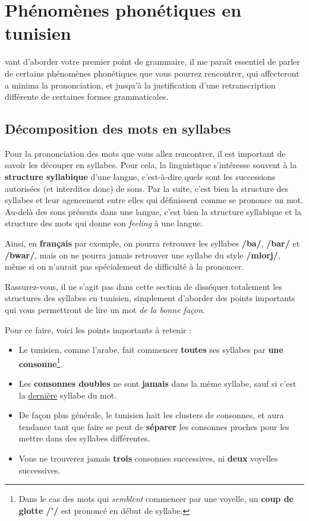\chapter{Phénomènes phonétiques en tunisien}
vant d'aborder votre premier point de grammaire, il me paraît essentiel de parler de certains phénomènes phonétiques que vous pourrez rencontrer, qui affecteront a minima la prononciation, et jusqu'à la justification d'une retranscription différente de certaines formes grammaticales.

\section{Décomposition des mots en syllabes}
Pour la prononciation des mots que vous allez rencontrer, il est important de savoir les découper en syllabes. Pour cela, la linguistique s'intéresse souvent à la \textbf{structure syllabique} d'une langue, c'est-à-dire quels sont les successions autorisées (et interdites donc) de sons. Par la suite, c'est bien la structure des syllabes et leur agencement entre elles qui définissent comme se prononce un mot. Au-delà des sons présents dans une langue, c'est bien la structure syllabique et la structure des mots qui donne son \textit{feeling} à une langue.

Ainsi, en \textbf{français} par exemple, on pourra retrouver les syllabes \textbf{/ba/}, \textbf{/bar/} et \textbf{/bwar/}, mais on ne pourra jamais retrouver une syllabe du style \textbf{/mlorj/}, même si on n'aurait pas spécialement de difficulté à la prononcer.

Rassurez-vous, il ne s'agit pas dans cette section de disséquer totalement les structures des syllabes en tunisien, simplement d'aborder des points importants qui vous permettront de lire un mot \textit{de la bonne façon}. 

Pour ce faire, voici les points importants à retenir : 
\begin{itemize}
    \item Le tunisien, comme l'arabe, fait commencer \textbf{toutes} ses syllabes par \textbf{une consonne}\footnote{Dans le cas des mots qui \textit{semblent} commencer par une voyelle, un \textbf{coup de glotte /'/} est prononcé en début de syllabe.}.
    \item Les \textbf{consonnes doubles} ne sont \textbf{jamais} dans la même syllabe, sauf si c'est la \underline{dernière} syllabe du mot.
    \item De façon plus générale, le tunisien hait les clusters de consonnes, et aura tendance tant que faire se peut de \textbf{séparer} les consonnes proches pour les mettre dans des syllabes différentes.
    \item Vous ne trouverez jamais \textbf{trois} consonnes successives, ni \textbf{deux} voyelles successives.
\end{itemize}

